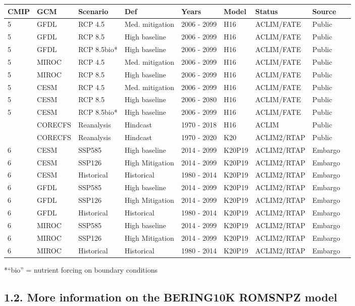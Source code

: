 \documentclass[
]{article}
\begin{document}
\begin{longtable}[]{@{}lllllllll@{}}
\toprule
CMIP & GCM & Scenario & Def & Years & Model & Status & Source
&\tabularnewline
\midrule
\endhead
5 & GFDL & RCP 4.5 & Med. mitigation & 2006 - 2099 & H16 & ACLIM/FATE &
Public &\tabularnewline
5 & GFDL & RCP 8.5 & High baseline & 2006 - 2099 & H16 & ACLIM/FATE &
Public &\tabularnewline
5 & GFDL & RCP 8.5bio* & High baseline & 2006 - 2099 & H16 & ACLIM/FATE
& Public &\tabularnewline
5 & MIROC & RCP 4.5 & Med. mitigation & 2006 - 2099 & H16 & ACLIM/FATE &
Public &\tabularnewline
5 & MIROC & RCP 8.5 & High baseline & 2006 - 2099 & H16 & ACLIM/FATE &
Public &\tabularnewline
5 & CESM & RCP 4.5 & Med. mitigation & 2006 - 2099 & H16 & ACLIM/FATE &
Public &\tabularnewline
5 & CESM & RCP 8.5 & High baseline & 2006 - 2080 & H16 & ACLIM/FATE &
Public &\tabularnewline
5 & CESM & RCP 8.5bio* & High baseline & 2006 - 2099 & H16 & ACLIM/FATE
& Public &\tabularnewline
& CORECFS & Reanalysis & Hindcast & 1970 - 2018 & H16 & ACLIM & Public
&\tabularnewline
& CORECFS & Reanalysis & Hindcast & 1970 - 2020 & K20 & ACLIM2/RTAP &
Public &\tabularnewline
6 & CESM & SSP585 & High baseline & 2014 - 2099 & K20P19 & ACLIM2/RTAP &
Embargo &\tabularnewline
6 & CESM & SSP126 & High Mitigation & 2014 - 2099 & K20P19 & ACLIM2/RTAP
& Embargo &\tabularnewline
6 & CESM & Historical & Historical & 1980 - 2014 & K20P19 & ACLIM2/RTAP
& Embargo &\tabularnewline
6 & GFDL & SSP585 & High baseline & 2014 - 2099 & K20P19 & ACLIM2/RTAP &
Embargo &\tabularnewline
6 & GFDL & SSP126 & High Mitigation & 2014 - 2099 & K20P19 & ACLIM2/RTAP
& Embargo &\tabularnewline
6 & GFDL & Historical & Historical & 1980 - 2014 & K20P19 & ACLIM2/RTAP
& Embargo &\tabularnewline
6 & MIROC & SSP585 & High baseline & 2014 - 2099 & K20P19 & ACLIM2/RTAP
& Embargo &\tabularnewline
6 & MIROC & SSP126 & High Mitigation & 2014 - 2099 & K20P19 &
ACLIM2/RTAP & Embargo &\tabularnewline
6 & MIROC & Historical & Historical & 1980 - 2014 & K20P19 & ACLIM2/RTAP
& Embargo &\tabularnewline
\bottomrule
\end{longtable}

*``bio'' = nutrient forcing on boundary conditions

\hypertarget{more-information-on-the-bering10k-romsnpz-model}{%
\subsection{1.2. More information on the BERING10K ROMSNPZ
model}\label{more-information-on-the-bering10k-romsnpz-model}}
\end{document}
